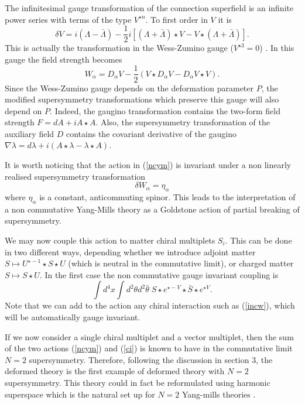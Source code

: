 \documentclass[a4paper,12pt]{article}
\begin{document}
The infinitesimal gauge transformation of the connection superfield is an
infinite power series 
with terms  of the type $V^{\star n}$. To first order in $V$ it is
$$
\delta V=i(\Lambda-\bar \Lambda)-\frac{1}{2}i[(\Lambda+\bar \Lambda)\star
V-V\star(\Lambda +\bar\Lambda)].
$$
This is actually the transformation in the Wess-Zumino gauge ($V^{\star
3}=0$) 
\cite{wz2, fz}. In this gauge the field
strength becomes 
$$
W_\alpha=D_\alpha V -\frac{1}{2}(V\star D_\alpha V-D_\alpha V\star V).
$$
Since the Wess-Zumino gauge depends on the deformation parameter $P$, the
modified 
supersymmetry transformations which preserve this gauge will also depend
on $P$. Indeed,
the gaugino transformation contains the   two-form field strength $F=dA
+iA\star A$. Also, the 
supersymmetry transformation of the auxiliary field $D$ contains the
covariant 
derivative of the gaugino $\nabla \lambda =d\lambda + i(A\star \lambda
-\lambda\star A)$. 


It is worth noticing that the action in (\ref{ncym})  is invariant under a
non linearly realised 
supersymmetry transformation 
$$
\delta W_\alpha =\eta_\alpha
$$
where $\eta_\alpha$ is a constant, anticommuting spinor. This leads to the
interpretation of
 a non commutative Yang-Mills theory as a Goldstone action of partial
breaking of supersymmetry.


We may now couple this action to matter chiral multiplets $S_i$. This can
be done in two different ways,
depending whether we introduce adjoint matter $S\mapsto U^{\star -1}\star
S\star U$ (which is
neutral in the commutative limit), or charged matter $S\mapsto S\star U$.
In the first case the non commutative gauge invariant coupling is
\begin{equation}
\int d^4x\int d^2\theta d^2\bar \theta\; S\star e^{\star -V}\star\bar
S\star e^{\star V}.
\label{ci}
\end{equation}
Note that we can add to the action any chiral interaction such as
(\ref{incw}), which will be 
automatically gauge invariant.

 If we now consider   a single chiral multiplet and a vector   multiplet,
then the sum of the two actions
(\ref{ncym}) and (\ref{ci}) is known to have in the commutative limit
$N=2$ supersymmetry. Therefore, 
following the discussion in section 3, the deformed theory is the first
example of 
deformed theory with $N=2$ supersymmetry. This theory could in fact be
reformulated using harmonic superspace
which is the natural set up for $N=2$ Yang-mills theories \cite{gikos}.
\end{document}
